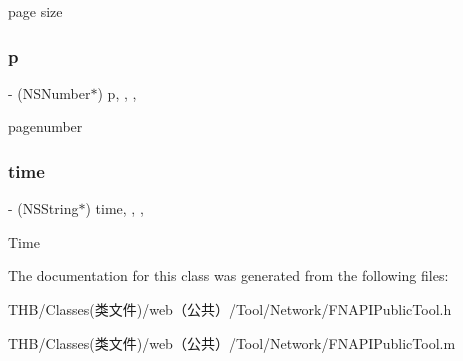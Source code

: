 page size \mbox{\label{interface_f_n_a_p_i_public_tool_a941375bc980d0bf7c4f9920f8f8889e2}} 
\subsubsection{\texorpdfstring{p}{p}}
{\footnotesize\ttfamily -\/ (N\+S\+Number$\ast$) p\hspace{0.3cm}{\ttfamily [read]}, {\ttfamily [write]}, {\ttfamily [nonatomic]}, {\ttfamily [strong]}}

pagenumber \mbox{\label{interface_f_n_a_p_i_public_tool_a22c8fd18c744abdce437586e7769a874}} 
\subsubsection{\texorpdfstring{time}{time}}
{\footnotesize\ttfamily -\/ (N\+S\+String$\ast$) time\hspace{0.3cm}{\ttfamily [read]}, {\ttfamily [write]}, {\ttfamily [nonatomic]}, {\ttfamily [copy]}}

Time 

The documentation for this class was generated from the following files\+:\begin{DoxyCompactItemize}
\item 
T\+H\+B/\+Classes(类文件)/web（公共）/\+Tool/\+Network/F\+N\+A\+P\+I\+Public\+Tool.\+h\item 
T\+H\+B/\+Classes(类文件)/web（公共）/\+Tool/\+Network/F\+N\+A\+P\+I\+Public\+Tool.\+m\end{DoxyCompactItemize}
